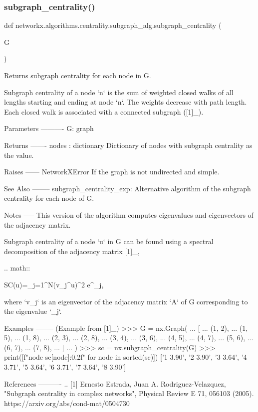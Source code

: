 \subsubsection{\texorpdfstring{subgraph\+\_\+centrality()}{subgraph\_centrality()}}
{\footnotesize\ttfamily def networkx.\+algorithms.\+centrality.\+subgraph\+\_\+alg.\+subgraph\+\_\+centrality (\begin{DoxyParamCaption}\item[{}]{G }\end{DoxyParamCaption})}

\begin{DoxyVerb}Returns subgraph centrality for each node in G.

Subgraph centrality  of a node `n` is the sum of weighted closed
walks of all lengths starting and ending at node `n`. The weights
decrease with path length. Each closed walk is associated with a
connected subgraph ([1]_).

Parameters
----------
G: graph

Returns
-------
nodes : dictionary
   Dictionary of nodes with subgraph centrality as the value.

Raises
------
NetworkXError
   If the graph is not undirected and simple.

See Also
--------
subgraph_centrality_exp:
    Alternative algorithm of the subgraph centrality for each node of G.

Notes
-----
This version of the algorithm computes eigenvalues and eigenvectors
of the adjacency matrix.

Subgraph centrality of a node `u` in G can be found using
a spectral decomposition of the adjacency matrix [1]_,

.. math::

   SC(u)=\sum_{j=1}^{N}(v_{j}^{u})^2 e^{\lambda_{j}},

where `v_j` is an eigenvector of the adjacency matrix `A` of G
corresponding to the eigenvalue `\lambda_j`.

Examples
--------
(Example from [1]_)
>>> G = nx.Graph(
...     [
...         (1, 2),
...         (1, 5),
...         (1, 8),
...         (2, 3),
...         (2, 8),
...         (3, 4),
...         (3, 6),
...         (4, 5),
...         (4, 7),
...         (5, 6),
...         (6, 7),
...         (7, 8),
...     ]
... )
>>> sc = nx.subgraph_centrality(G)
>>> print([f"{node} {sc[node]:0.2f}" for node in sorted(sc)])
['1 3.90', '2 3.90', '3 3.64', '4 3.71', '5 3.64', '6 3.71', '7 3.64', '8 3.90']

References
----------
.. [1] Ernesto Estrada, Juan A. Rodriguez-Velazquez,
   "Subgraph centrality in complex networks",
   Physical Review E 71, 056103 (2005).
   https://arxiv.org/abs/cond-mat/0504730\end{DoxyVerb}
